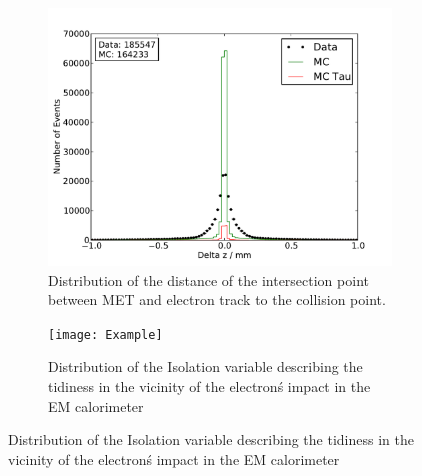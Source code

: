 \documentclass[
	paper=A4,
	parskip=full,
	chapterprefix=true,
	11pt,
	headings=normal,
	bibliography=totoc,
	listof=totoc,
	titlepage=on,
]{scrreprt}
\begin{document}
\begin{figure}%
	\centering
	\begin{subfigure}{0.45\textwidth}
		\includegraphics{./nocuts/delta_z}
		\caption{Distribution of the distance of the intersection point between MET and electron track to the collision point.}
	\end{subfigure}
	\begin{subfigure}{0.45\textwidth}
		\texttt{[image: Example]}
		\caption{Distribution of the Isolation variable describing the tidiness in the vicinity of the electron\'s impact in the EM calorimeter}
	\end{subfigure}
	\label{no_cuts_dziso}
\end{figure}


\cleardoublepage


{}
\end{document}
